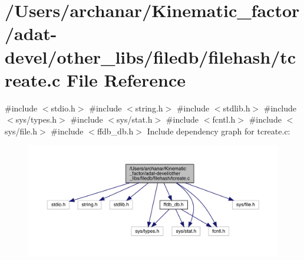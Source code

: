 \hypertarget{adat-devel_2other__libs_2filedb_2filehash_2tcreate_8c}{}\section{/\+Users/archanar/\+Kinematic\+\_\+factor/adat-\/devel/other\+\_\+libs/filedb/filehash/tcreate.c File Reference}
\label{adat-devel_2other__libs_2filedb_2filehash_2tcreate_8c}
{\ttfamily \#include $<$stdio.\+h$>$}\newline
{\ttfamily \#include $<$string.\+h$>$}\newline
{\ttfamily \#include $<$stdlib.\+h$>$}\newline
{\ttfamily \#include $<$sys/types.\+h$>$}\newline
{\ttfamily \#include $<$sys/stat.\+h$>$}\newline
{\ttfamily \#include $<$fcntl.\+h$>$}\newline
{\ttfamily \#include $<$sys/file.\+h$>$}\newline
{\ttfamily \#include $<$ffdb\+\_\+db.\+h$>$}\newline
Include dependency graph for tcreate.\+c\+:
\nopagebreak
\begin{figure}[H]
\begin{center}
\leavevmode
\includegraphics[width=350pt]{de/dc9/adat-devel_2other__libs_2filedb_2filehash_2tcreate_8c__incl}
\end{center}
\end{figure}

